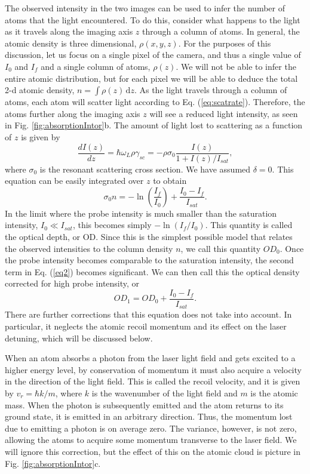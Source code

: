\documentclass[12pt]{iopart}
\begin{document}
\par The observed intensity in the two images can be used to infer the number of atoms that the light encountered. To do this, consider what happens to the light as it travels along the imaging axis $z$ through a column of atoms. In general, the atomic density is three dimensional, $\rho(x,y,z)$. For the purposes of this discussion, let us focus on a single pixel of the camera, and thus a single value of $I_0$ and $I_f$ and a single column of atoms, $\rho(z)$. We will not be able to infer the entire atomic distribution, but for each pixel we will be able to deduce the total 2-d atomic density, $n = \int \rho\left(z\right) \,\mathrm{d}z$. As the light travels through a column of atoms, each atom will scatter light according to Eq. (\ref{eq:scatrate}). Therefore, the atoms further along the imaging axis $z$ will see a reduced light intensity, as seen in Fig. \ref{fig:absorptionIntor}b. The amount of light lost to scattering as a function of $z$ is given by
\begin{equation}
\frac{dI(z)}{dz}=\hbar\omega_L\rho\gamma_{sc}=-\rho\sigma_0\frac{I(z)}{1+I(z)/I_{sat}},
\end{equation}
where $\sigma_0$ is the resonant scattering cross section. We have assumed $\delta=0$. 
 This equation can be easily integrated over $z$ to obtain  \cite{Reinaudi07}
\begin{equation} 
\sigma_0 n = -\ln\left(\frac{I_f}{I_0}\right) + \frac{I_0-I_f}{I_{sat}}.
\label{eq2}
\end{equation}
In the limit where the probe intensity is much smaller than the saturation intensity, $I_0\ll I_{sat}$, this becomes simply $-\ln \left(I_f/I_0\right)$. This quantity is called the optical depth, or OD. Since this is the simplest possible model that relates the observed intensities to the column density $n$, we call this quantity $OD_0$. Once the probe intensity becomes comparable to the saturation intensity, the second term in Eq. (\ref{eq2}) becomes significant. We can then call this the optical density corrected for high probe intensity, or
\begin{equation} 
OD_1 = OD_0 + \frac{I_0-I_f}{I_{sat}}.
\label{eq:OD1}
\end{equation}
There are further corrections that this equation does not take into account. In particular, it neglects the atomic recoil momentum and its effect on the laser detuning, which will be discussed below.
\par When an atom absorbs a photon from the laser light field and gets excited to a higher energy level, by conservation of momentum it must also acquire a velocity in the direction of the light field. This is called the recoil velocity, and it is given by $v_r=\hbar k/m$, where $k$ is the wavenumber of the light field and $m$ is the atomic mass. When the photon is subsequently emitted and the atom returns to its ground state, it is emitted in an arbitrary direction. Thus, the momentum lost due to emitting a photon is on average zero. The variance, however, is not zero, allowing the atoms to acquire some momentum transverse to the laser field. We will ignore this correction, but the effect of this on the atomic cloud is picture in Fig. \ref{fig:absorptionIntor}c. 
\end{document}
